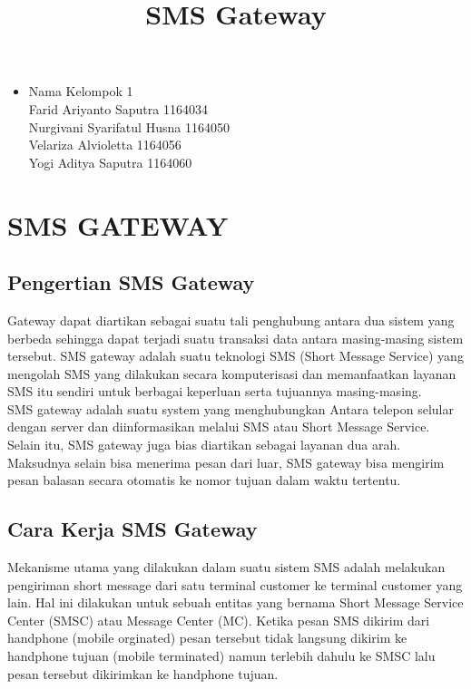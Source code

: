 \documentclass[12pt,a4paper]{article}
\begin{document}
\title{SMS Gateway}
\maketitle

\begin{itemize}
\item
Nama Kelompok 1\\
Farid Ariyanto Saputra 1164034\\
Nurgivani Syarifatul Husna 1164050\\
Velariza Alvioletta 1164056\\
Yogi Aditya Saputra 1164060 \\
\end{itemize}

\section{SMS GATEWAY}
\subsection{Pengertian SMS Gateway}
Gateway dapat diartikan sebagai suatu tali penghubung antara dua sistem yang berbeda sehingga dapat terjadi suatu transaksi data antara masing-masing sistem tersebut. SMS gateway adalah suatu teknologi SMS (Short Message Service) yang mengolah SMS yang dilakukan secara komputerisasi dan memanfaatkan layanan SMS itu sendiri untuk berbagai keperluan serta tujuannya masing-masing. \\
SMS gateway adalah suatu system yang menghubungkan Antara telepon selular dengan server dan diinformasikan melalui SMS atau Short Message Service. Selain itu, SMS gateway juga bias diartikan sebagai layanan dua arah. Maksudnya selain bisa menerima pesan dari luar,  SMS gateway bisa mengirim pesan balasan secara otomatis ke nomor tujuan dalam waktu tertentu.
\subsection{Cara Kerja SMS Gateway}
Mekanisme utama yang dilakukan dalam suatu sistem SMS adalah melakukan pengiriman short message dari satu terminal customer ke terminal customer yang lain. Hal ini dilakukan untuk sebuah entitas yang bernama  Short Message Service Center (SMSC) atau Message Center (MC). Ketika pesan SMS dikirim dari handphone (mobile orginated) pesan tersebut tidak langsung dikirim ke handphone tujuan (mobile terminated) namun terlebih dahulu ke SMSC lalu pesan tersebut dikirimkan ke handphone tujuan.
\end{document}
